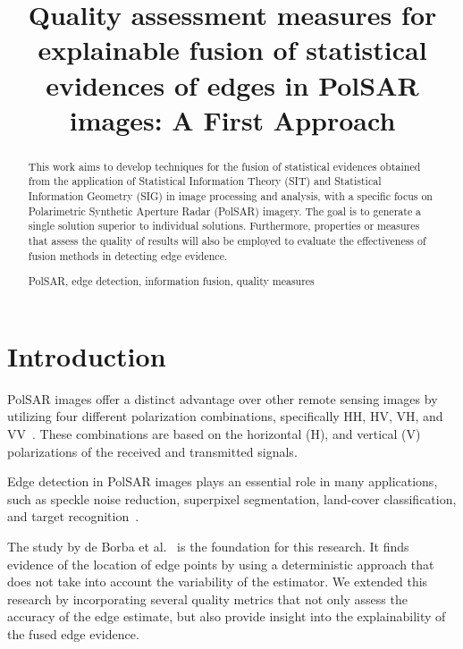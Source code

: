 \documentclass{article}
\title{Quality assessment measures for explainable fusion of statistical evidences of edges in PolSAR images: A First Approach}
\begin{document}
%
\maketitle
%
\begin{abstract}
\vspace{-0.2cm}
This work aims to develop techniques for the fusion of statistical evidences obtained from the application of Statistical Information Theory (SIT) and Statistical Information Geometry (SIG) in image processing and analysis, with a specific focus on Polarimetric Synthetic Aperture Radar (PolSAR) imagery. The goal is to generate a single solution superior to individual solutions. Furthermore, properties or measures that assess the quality of results will also be employed to evaluate the effectiveness of fusion methods in detecting edge evidence.

%
\begin{keywords}
PolSAR, edge detection,  information fusion,  quality
measures 
\end{keywords}
%
\end{abstract}
\vspace{-0.3cm}
\section{Introduction}
\vspace{-0.2cm}
PolSAR images offer a distinct advantage over other remote sensing images by utilizing four different polarization combinations, specifically HH, HV, VH, and VV~\cite{Hua2022}. These combinations are based on the horizontal (H), and vertical (V) polarizations of the received and transmitted signals. 
 
Edge detection in PolSAR images plays an essential role in many applications, such as speckle noise reduction, superpixel segmentation, land-cover classification, and target recognition~\cite{Jin2016}. 


The study by de Borba et al.~\cite{DeBorba2020} is the foundation for this research. 
It finds evidence of the location of edge points by using a deterministic approach that does not take into account the variability of the estimator. We extended this research by incorporating several quality metrics that not only assess the accuracy of the edge estimate, but also provide insight into the explainability of the fused edge evidence.
\end{document}
